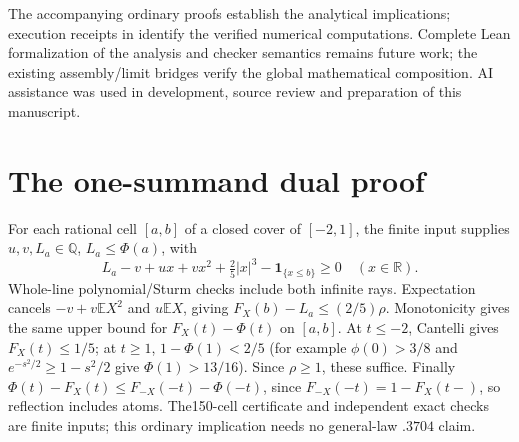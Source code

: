 \documentclass[11pt,a4paper]{article}
\newcommand{\E}{\mathbb E}
\newcommand{\R}{\mathbb R}
\begin{document}
The accompanying ordinary proofs establish the analytical implications;
execution receipts in  identify the verified
numerical computations. Complete Lean formalization of the analysis and checker
semantics remains future work; the existing assembly/limit bridges verify the
global mathematical composition. AI assistance was used in development, source
review and preparation of this manuscript.

\appendix
\section{The one-summand dual proof}\label{app:n1}
For each rational cell $[a,b]$ of a closed cover of $[-2,1]$, the finite
input supplies $u,v,L_a\in\mathbb Q$, $L_a\le\Phi(a)$, with
\[
 L_a-v+ux+vx^2+\tfrac25|x|^3-\mathbf1_{\{x\le b\}}\ge0\quad(x\in\R).
\]
Whole-line polynomial/Sturm checks include both infinite rays.
Expectation cancels $-v+v\E X^2$ and $u\E X$, giving
$F_X(b)-L_a\le(2/5)\rho$. Monotonicity gives the same upper bound for
$F_X(t)-\Phi(t)$ on $[a,b]$. At $t\le-2$, Cantelli gives $F_X(t)\le1/5$;
at $t\ge1$, $1-\Phi(1)<2/5$ (for example $\phi(0)>3/8$ and
$e^{-s^2/2}\ge1-s^2/2$ give $\Phi(1)>13/16$). Since $\rho\ge1$,
these suffice. Finally
$\Phi(t)-F_X(t)\le F_{-X}(-t)-\Phi(-t)$, since
$F_{-X}(-t)=1-F_X(t-)$, so reflection includes atoms.
The150-cell certificate and independent exact checks are finite inputs;
this ordinary implication needs no general-law $.3704$ claim.
\end{document}
